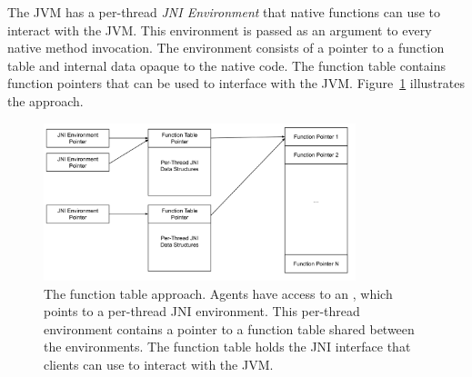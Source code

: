 \begin{figure}[b]
\par\noindent\begin{minipage}[t]{.45\textwidth}

\end{minipage}\hfill
\begin{minipage}[t]{.5\textwidth}

\end{minipage}
\caption*{} %
\end{figure}

The JVM has a per-thread \emph{JNI Environment} that native functions can use to interact with the JVM. This environment is passed as an argument to every native method invocation. The environment consists of a pointer to a function table and internal data opaque to the native code. The function table contains function pointers that can be used to interface with the JVM. Figure~\ref{fig:jni_function_table} illustrates the approach.

\begin{figure}[h]
\centering
\includegraphics[width=0.81\textwidth]{src/figure/jni_function_table.png}
\caption{The function table approach. Agents have access to an , which points to a per-thread JNI environment. This per-thread environment contains a pointer to a function table shared between the environments. The function table holds the JNI interface that clients can use to interact with the JVM.}
\label{fig:jni_function_table}
\end{figure}

